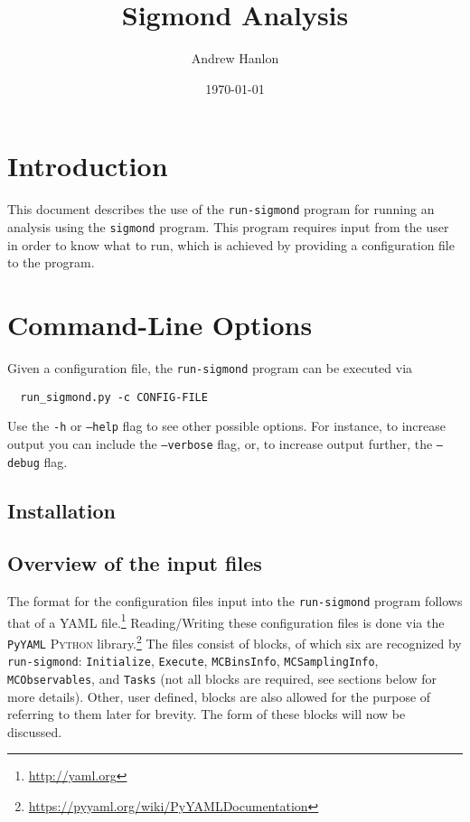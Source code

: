 \documentclass[12pt,letterpaper,notitlepage]{article}
\title{\bf Sigmond Analysis}
\author{Andrew Hanlon}
\date{\today}
\newcommand{\key}[1]{\textcolor{Emerald}{\texttt{\small{#1}}}}
\newcommand{\runsigmond}{\texttt{run-sigmond}}
\newcommand{\sigmond}{\texttt{sigmond}}
\begin{document}
\maketitle

\section{Introduction}

This document describes the use of the \runsigmond{} program for running an analysis using the \sigmond{} program.
This program requires input from the user in order to know what to run,
which is achieved by providing a configuration file to the program.

\section{Command-Line Options}

Given a configuration file, the \runsigmond{} program can be executed via
\begin{verbatim}
  run_sigmond.py -c CONFIG-FILE
\end{verbatim}
Use the \texttt{-h} or \texttt{--help} flag to see other possible options.
For instance, to increase output you can include the \texttt{--verbose} flag,
or, to increase output further, the \texttt{--debug} flag.

\subsection{Installation}

\subsection{Overview of the input files}

The format for the configuration files input into the \runsigmond{} program follows that of a \textsc{YAML} file.\footnote{\url{http://yaml.org}}
Reading/Writing these configuration files is done via the \texttt{PyYAML} \textsc{Python} library.\footnote{\url{https://pyyaml.org/wiki/PyYAMLDocumentation}}
The files consist of blocks, of which six are recognized by \runsigmond{}:
\key{Initialize}, \key{Execute}, \key{MCBinsInfo}, \key{MCSamplingInfo}, \key{MCObservables}, and \key{Tasks}
(not all blocks are required, see sections below for more details).
Other, user defined, blocks are also allowed for the purpose of referring to them later for brevity.
The form of these blocks will now be discussed.
\end{document}
